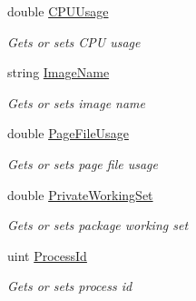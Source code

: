 \begin{DoxyCompactItemize}
\item 
double \hyperlink{class_microsoft_1_1_tools_1_1_windows_device_portal_1_1_device_portal_1_1_process_info_a45e2b7c289265add61371de65ed04bd6}{C\+P\+U\+Usage}
\begin{DoxyCompactList}\small\item\em Gets or sets C\+PU usage \end{DoxyCompactList}\item 
string \hyperlink{class_microsoft_1_1_tools_1_1_windows_device_portal_1_1_device_portal_1_1_process_info_abf84a935a590cbd0358f73ee2ddbf702}{Image\+Name}
\begin{DoxyCompactList}\small\item\em Gets or sets image name \end{DoxyCompactList}\item 
double \hyperlink{class_microsoft_1_1_tools_1_1_windows_device_portal_1_1_device_portal_1_1_process_info_a21c01a77fdbb3ec55f50f699f1038042}{Page\+File\+Usage}
\begin{DoxyCompactList}\small\item\em Gets or sets page file usage \end{DoxyCompactList}\item 
double \hyperlink{class_microsoft_1_1_tools_1_1_windows_device_portal_1_1_device_portal_1_1_process_info_a0ed6e401e5213f691b332fdaf1caeff8}{Private\+Working\+Set}
\begin{DoxyCompactList}\small\item\em Gets or sets package working set \end{DoxyCompactList}\item 
uint \hyperlink{class_microsoft_1_1_tools_1_1_windows_device_portal_1_1_device_portal_1_1_process_info_a43309d13a583cf63dd0880a73c03e63c}{Process\+Id}
\begin{DoxyCompactList}\small\item\em Gets or sets process id \end{DoxyCompactList}\item 

\end{DoxyCompactItemize}
